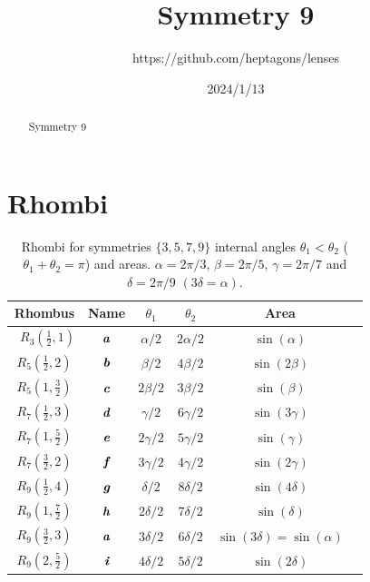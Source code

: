\documentclass[11pt]{article}
\title{Symmetry 9}
\author{https://github.com/heptagons/lenses}
\date{2024/1/13}
\def\mathbi#1{\textbf{\em #1}}
\begin{document}
\maketitle
\begin{abstract}
Symmetry 9
\end{abstract}

\section{Rhombi}

\begin{table}[H]
\begin{center}
\begin{tabular}{|c|c|c c| c | l |}
\hline
Rhombus & Name & $\theta_1$ & $\theta_2$ & Area \\ \hline\
$R_3(\frac{1}2,1)$ & $\mathbi{a}$ & $\alpha/2$ & $2\alpha/2$  & $\sin(\alpha)$ \\[0.5ex]
\hline
$R_5(\frac{1}2,2)$ & $\mathbi{b}$ & $\beta/2$  & $4\beta/2$   & $\sin(2\beta)$\\[0.5ex]
$R_5(1,\frac{3}2)$ & $\mathbi{c}$ & $2\beta/2$ & $3\beta/2$   & $\sin(\beta)$\\[0.5ex]
\hline
$R_7(\frac{1}2,3)$ & $\mathbi{d}$ & $\gamma/2$ & $6\gamma/2$  & $\sin(3\gamma)$\\[0.5ex]
$R_7(1,\frac{5}2)$ & $\mathbi{e}$ & $2\gamma/2$ & $5\gamma/2$ & $\sin(\gamma)$\\[0.5ex]
$R_7(\frac{3}2,2)$ & $\mathbi{f}$ & $3\gamma/2$ & $4\gamma/2$ & $\sin(2\gamma)$\\[0.5ex]
\hline
$R_9(\frac{1}2,4)$ & $\mathbi{g}$ & $\delta/2$ & $8\delta/2$  & $\sin(4\delta)$\\[0.5ex]
$R_9(1,\frac{7}2)$ & $\mathbi{h}$ & $2\delta/2$ & $7\delta/2$ & $\sin(\delta)$\\[0.5ex]
$R_9(\frac{3}2,3)$ & $\mathbi{a}$ & $3\delta/2$ & $6\delta/2$ & $\sin(3\delta)=\sin(\alpha)$\\[0.5ex]
$R_9(2,\frac{5}2)$ & $\mathbi{i}$ & $4\delta/2$ & $5\delta/2$ & $\sin(2\delta)$\\[0.5ex]
\hline
\end{tabular}
\caption{Rhombi for symmetries $\{3,5,7,9\}$ internal angles $\theta_1 < \theta_2$ ($\theta_1 + \theta_2 = \pi$) and areas. $\alpha = 2\pi/3$, $\beta = 2\pi/5$, $\gamma = 2\pi/7$ and $\delta = 2\pi/9$ $(3\delta = \alpha)$.} 
\label{tbl:rhombi}
\end{center}
\end{table}
\end{document}
